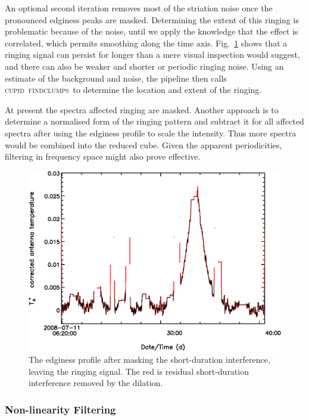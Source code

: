 \documentclass[useAMS,usenatbib]{mn2e}
\newcommand{\cupid}{\textsc{cupid}}
\newcommand{\findclumps}{\textsc{findclumps}}
\begin{document}
An optional second iteration removes most of the striation noise once
the pronounced edginess peaks are masked.  Determining the extent of
this ringing is problematic because of the noise, until we apply the
knowledge that the effect is correlated, which permits smoothing
along the time axis.
Fig.~\ref{fig:badbase:ringing_edginess_profile} shows that a ringing
signal can persist for longer than a mere visual inspection would
suggest, and there can also be weaker and shorter or periodic ringing
noise.  Using an estimate of the background and noise, the pipeline
then calls \cupid\ \findclumps\ to determine the location and extent
of the ringing.

At present the spectra affected ringing are masked.  Another approach
is to determine a normalised form of the ringing pattern and subtract
it for all affected spectra after using the edginess profile to scale
the intensity.  Thus more spectra would be combined into the reduced
cube.  Given the apparent periodicities, filtering in frequency
space might also prove effective.

\begin{figure}
\includegraphics[width=\columnwidth]{ringing_edginess_profile}
\caption{The edginess profile after masking the short-duration
  interference, leaving the ringing signal.  The red is residual
  short-duration interference removed by the dilation.}
\label{fig:badbase:ringing_edginess_profile}
\end{figure}


\subsubsection{Non-linearity Filtering}
\label{sec:non-linearity}
\end{document}

